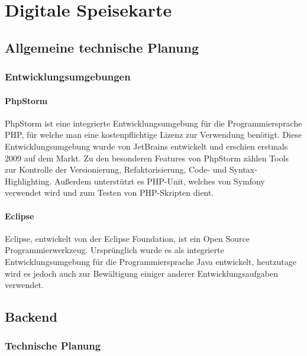 ﻿\chapter{Digitale Speisekarte}
\renewcommand{\kapitelautor}{Autor: Katharina Joksch}

\section{Allgemeine technische Planung}

  \subsection{Entwicklungsumgebungen}

    \subsubsection{PhpStorm}
    
PhpStorm ist eine integrierte Entwicklungsumgebung für die Programmiersprache PHP, für welche man eine kostenpflichtige Lizenz zur Verwendung benötigt. Diese Entwicklungsumgebung wurde von JetBrains entwickelt und erschien erstmals 2009 auf dem Markt. Zu den besonderen Features von PhpStorm zählen Tools zur Kontrolle der Versionierung, Refaktorisierung, Code- und Syntax-Highlighting. Außerdem unterstützt es PHP-Unit, welches von Symfony verwendet wird und zum Testen von PHP-Skripten dient.

    \subsubsection{Eclipse}
    
Eclipse, entwickelt von der Eclipse Foundation, ist ein Open Source Programmierwerkzeug. Ursprünglich wurde es als integrierte Entwicklungsumgebung für die Programmiersprache Java entwickelt, heutzutage wird es jedoch auch zur Bewältigung einiger anderer Entwicklungsaufgaben verwendet.

\section{Backend}

  \subsection{Technische Planung}


